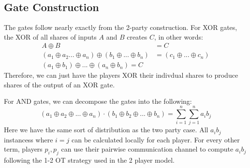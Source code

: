 \documentclass[11pt]{article}
\begin{document}
\subsection{Gate Construction}
The gates follow nearly exactly from the 2-party construction. For XOR gates, the XOR of all shares of inputs $A$ and $B$ creates $C$, in other words:
\begin{align*}
    A \oplus B &= C\\
    (a_1 \oplus a_2 ... \oplus a_n)\oplus(b_1 \oplus ... \oplus b_n) &= (c_1 \oplus ... \oplus c_n)\\
    (a_1 \oplus b_1) \oplus ... \oplus (a_n \oplus b_n) = C
\end{align*}
Therefore, we can just have the players XOR their indivdual shares to produce shares of the output of an XOR gate.
\bigskip

For AND gates, we can decompose the gates into the following:
$$(a_1 \oplus a_2 \oplus ... \oplus a_n) \cdot (b_1 \oplus b_2 \oplus ... \oplus b_n) = \sum_{i=1}^n\sum_{j=1}^n a_ib_j$$
Here we have the same sort of distribution as the two party case. All $a_ib_j$ instancess where $i=j$ can be calculated locally for each player. For every other term, players $p_i,p_j$ can use their pairwise communication channel to compute $a_ib_j$ following the 1-2 OT strategy used in the 2 player model.
\end{document}
